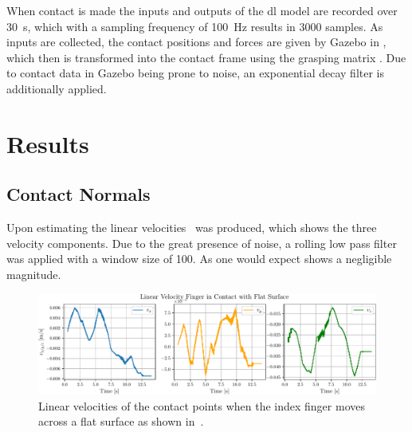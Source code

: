When contact is made the inputs and outputs of the \gls{dl} model are recorded over \SI{30}{\second}, which with a sampling frequency of \SI{100}{\hertz} results in \num{3 000} samples. As inputs are collected, the contact positions and forces are given by Gazebo in , which then is transformed into the contact frame  using the grasping matrix . Due to contact data in Gazebo being prone to noise, an exponential decay filter is additionally applied.



\newpage
\section{Results}\label{sec:1-tactile-perception-results}

\subsection{Contact Normals}\label{sec:1-tactile-perception-results-contact-normals}

Upon estimating the linear velocities~ was produced, which shows the three velocity components. Due to the great presence of noise, a rolling low pass filter was applied with a window size of \num{100}. As one would expect  shows a negligible magnitude. \medskip

\begin{figure}[!h]
	\begin{center}
		\includegraphics[width=\textwidth]{chapters/1-tactile-perception/fig/matplotlib/linear-velocity-finger-in-contact-with-flat-surface.pdf}
	\end{center}
	\caption{Linear velocities of the contact points when the index finger moves across a flat surface as shown in~.}
	\label{fig:linear-velocity-finger-in-contact-with-flat-surface}
\end{figure}

